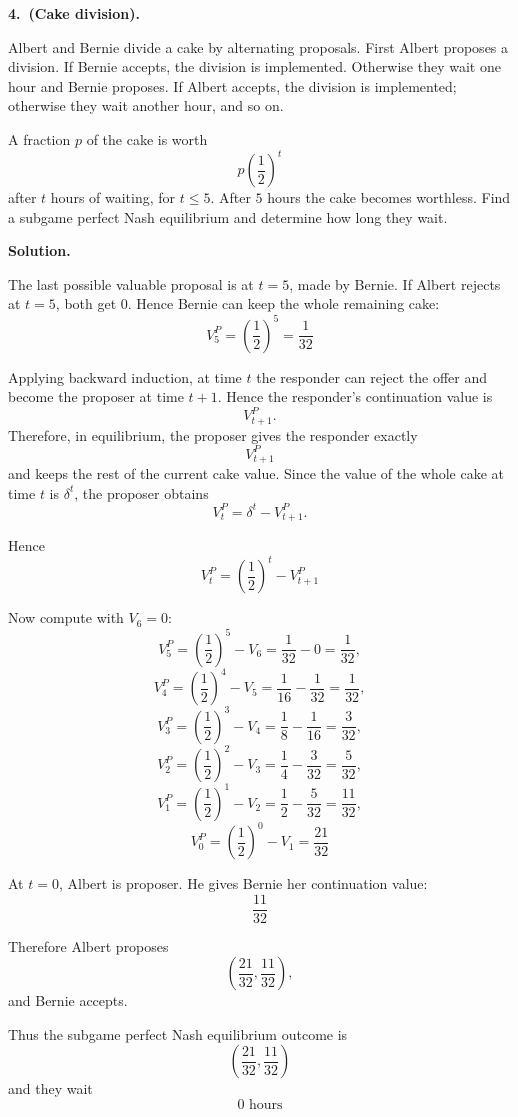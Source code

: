 \textbf{4.\ (Cake division).}

Albert and Bernie divide a cake by alternating proposals. First Albert proposes
a division. If Bernie accepts, the division is implemented. Otherwise they wait
one hour and Bernie proposes. If Albert accepts, the division is implemented;
otherwise they wait another hour, and so on.

A fraction \(p\) of the cake is worth
\[
p\left(\frac12\right)^t
\]
after \(t\) hours of waiting, for \(t\le 5\). After \(5\) hours the cake becomes
worthless. Find a subgame perfect Nash equilibrium and determine how long they wait.

\textbf{Solution.}

The last possible valuable proposal is at \(t=5\), made by Bernie. If Albert
rejects at \(t=5\), both get \(0\). Hence Bernie can keep the whole remaining cake:
\[
V_5^P=\left(\frac12\right)^5=\frac1{32}
\]


Applying backward induction, at time \(t\) the responder can reject the offer
and become the proposer at time \(t+1\). Hence the responder's continuation
value is
\[
V_{t+1}^P.
\]
Therefore, in equilibrium, the proposer gives the responder exactly
\[
V_{t+1}^P
\]
and keeps the rest of the current cake value. Since the value of the whole cake
at time \(t\) is \(\delta^t\), the proposer obtains
\[
V_t^P=\delta^t - V_{t+1}^P.
\]

Hence
\[
V_t^P=\left(\frac1{2}\right)^t - V_{t+1}^P
\]

Now compute with \(V_6=0\):
\[
V_5^P=\left(\frac1{2}\right)^5 - V_6=\frac1{32} - 0=\frac1{32},
\]
\[
V_4^P=\left(\frac1{2}\right)^4 - V_5=\frac1{16} - \frac1{32}=\frac1{32},
\]
\[
V_3^P=\left(\frac1{2}\right)^3 - V_4=\frac1{8} - \frac1{16}=\frac3{32},
\]
\[
V_2^P=\left(\frac1{2}\right)^2 - V_3=\frac1{4} - \frac3{32}=\frac5{32},
\]
\[
V_1^P=\left(\frac1{2}\right)^1 - V_2=\frac1{2} - \frac5{32}=\frac{11}{32},
\]
\[
V_0^P=\left(\frac1{2}\right)^0 - V_1=\frac{21}{32}
\]

At \(t=0\), Albert is proposer. He gives Bernie her continuation value:
\[
\frac{11}{32}
\]

Therefore Albert proposes
\[
\left(\frac{21}{32},\frac{11}{32}\right),
\]
and Bernie accepts.

Thus the subgame perfect Nash equilibrium outcome is
\[
\left(\frac{21}{32},\frac{11}{32}\right)
\]
and they wait
\[
0\text{ hours}
\]

